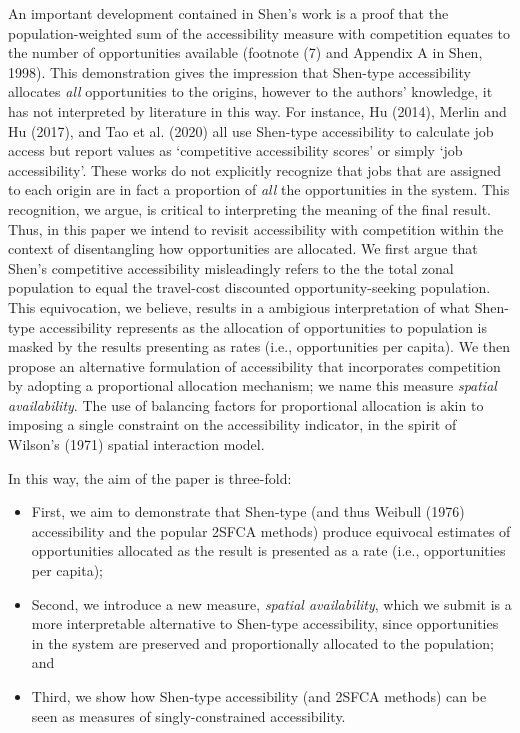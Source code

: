 \documentclass[]{elsarticle} %
\begin{document}
An important development contained in Shen's work is a proof that the
population-weighted sum of the accessibility measure with competition
equates to the number of opportunities available (footnote (7) and
Appendix A in Shen, 1998). This demonstration gives the impression that
Shen-type accessibility allocates \emph{all} opportunities to the
origins, however to the authors' knowledge, it has not interpreted by
literature in this way. For instance, Hu (2014), Merlin and Hu (2017),
and Tao et al. (2020) all use Shen-type accessibility to calculate job
access but report values as `competitive accessibility scores' or simply
`job accessibility'. These works do not explicitly recognize that jobs
that are assigned to each origin are in fact a proportion of \emph{all}
the opportunities in the system. This recognition, we argue, is critical
to interpreting the meaning of the final result. Thus, in this paper we
intend to revisit accessibility with competition within the context of
disentangling how opportunities are allocated. We first argue that
Shen's competitive accessibility misleadingly refers to the the total
zonal population to equal the travel-cost discounted opportunity-seeking
population. This equivocation, we believe, results in a ambigious
interpretation of what Shen-type accessibility represents as the
allocation of opportunities to population is masked by the results
presenting as rates (i.e., opportunities per capita). We then propose an
alternative formulation of accessibility that incorporates competition
by adopting a proportional allocation mechanism; we name this measure
\emph{spatial availability}. The use of balancing factors for
proportional allocation is akin to imposing a single constraint on the
accessibility indicator, in the spirit of Wilson's (1971) spatial
interaction model.

In this way, the aim of the paper is three-fold:

\begin{itemize}
\item
  First, we aim to demonstrate that Shen-type (and thus Weibull (1976)
  accessibility and the popular 2SFCA methods) produce equivocal
  estimates of opportunities allocated as the result is presented as a
  rate (i.e., opportunities per capita);
\item
  Second, we introduce a new measure, \emph{spatial availability}, which
  we submit is a more interpretable alternative to Shen-type
  accessibility, since opportunities in the system are preserved and
  proportionally allocated to the population; and
\item
  Third, we show how Shen-type accessibility (and 2SFCA methods) can be
  seen as measures of singly-constrained accessibility.
\end{itemize}
\end{document}
